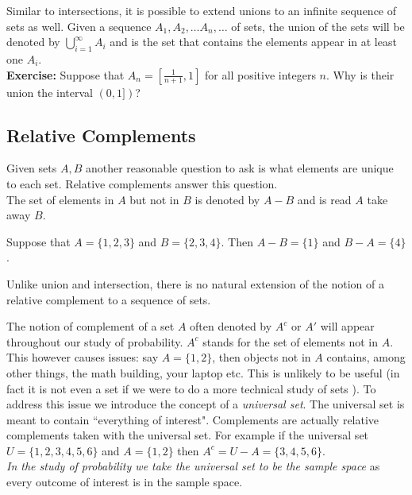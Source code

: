 \begin{appendices}
		Similar to intersections, it is possible to extend unions to an infinite sequence of sets as well. Given a sequence $A_1,A_2,\ldots A_n,\ldots$ of sets, the union of the sets will be denoted by $\bigcup_{i=1}^\infty A_i$ and is the set that contains the elements appear in at least one $A_i$.\\
		
		
		\noindent\textbf{Exercise:}  Suppose that $A_n=[\frac{1}{n+1}, 1]$ for all positive integers $n$. Why is their union the interval $(0, 1])$? 
		
		\subsection{Relative Complements}
		
		Given sets $A, B$ another reasonable question to ask is what elements are unique to each set. Relative complements answer this question.\\ 
		
		The set of elements in $A$ but not in $B$ is denoted by $A-B$ and is read $A$ take away $B$.
		
	    \begin{ex}
	    	Suppose that $A=\{1,2,3\}$ and $B=\{2,3,4\}$. Then $A-B=\{1\}$ and $B-A=\{4\}$.
	    \end{ex} 
		
		Unlike union and intersection, there is no natural extension of the notion of a relative complement to a sequence of sets.
		
		The notion of complement of a set $A$ often denoted by $A^c$ or $A'$ will appear throughout our study of probability. $A^c$ stands for the set of elements not in $A$. This however causes issues: say $A=\{1,2\}$, then objects not in $A$ contains, among other things, the math building, your laptop etc. This is unlikely to be useful (in fact it is not even a set if we were to do a more technical study of sets ). To address this issue we introduce the concept of a  \textit{universal set}. The universal set is meant to contain ``everything of interest".    Complements are actually relative complements taken with the universal set. For example if the universal set $U=\{1,2,3,4,5,6\}$ and $A=\{1,2\}$ then $A^c=U-A = \{3,4,5,6\}$. \\ 
		
		\textit{ In the study of probability we take the universal set to be the sample space} as every outcome of interest is in the sample space.
		
		
		 

\end{appendices}
